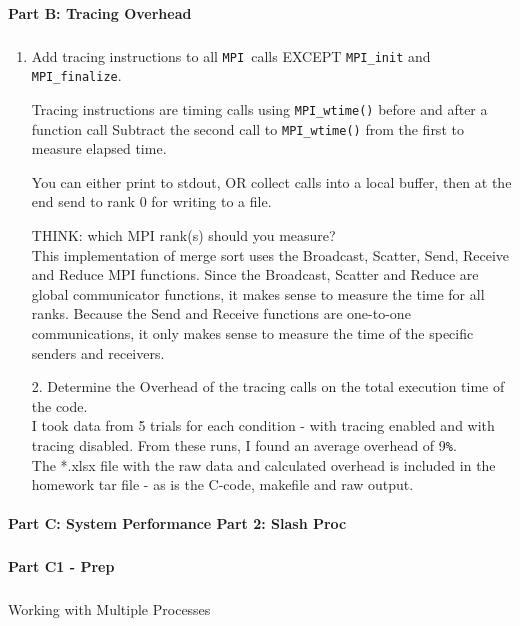\documentclass[11pt]{article}
\begin{document}
\paragraph{Part B: Tracing Overhead}
\subparagraph{}
\begin{enumerate}

\item Add tracing instructions to all \verb|MPI |calls EXCEPT \verb|MPI_init| and \verb|MPI_finalize|.\\

\begin{addmargin}[1em]{2em}%
Tracing instructions are timing calls using \verb|MPI_wtime()| before and after a function call Subtract the second call to \verb|MPI_wtime()| from the first to measure elapsed time.
\begin{addmargin}[1em]{2em}%
You can either print to stdout, OR collect calls into a local buffer, then at the end send to rank 0 for writing to a file.
\end{addmargin}

THINK: which MPI rank(s) should you measure? \\
This implementation of merge sort uses the Broadcast, Scatter, Send, Receive and Reduce MPI functions.  Since the Broadcast, Scatter and Reduce are global communicator functions, it makes sense to measure the time for all ranks. Because the Send and Receive functions are one-to-one communications, it only makes sense to measure the time of the specific senders and receivers.
\end{addmargin}
2. Determine the Overhead of the tracing calls on the total execution time of the code.\\
I took data from 5 trials for each condition - with tracing enabled and with tracing disabled.  From these runs, I found an average overhead of 9\verb|%|.\\
The *.xlsx file with the raw data and calculated overhead is included in the homework tar file - as is the C-code, makefile and raw output.

\end{enumerate}

\paragraph{Part C: System Performance Part 2: Slash Proc}
\subparagraph{}

\paragraph{Part C1 - Prep}
\subparagraph{}
Working with Multiple Processes\\
\end{document}
